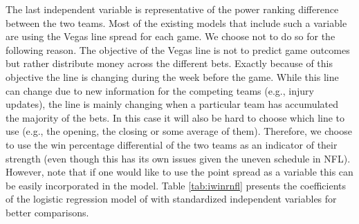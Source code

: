 The last independent variable is representative of the power ranking difference between the two teams. 
Most of the existing models that include such a variable are using the Vegas line spread for each game.  
We choose not to do so for the following reason.  
The objective of the Vegas line is not to predict game outcomes but rather distribute money across the different bets.  
Exactly because of this objective the line is changing during the week before the game.  
While this line can change due to new information for the competing teams (e.g., injury updates), the line is mainly changing when a particular team has accumulated the majority of the bets. 
In this case it will also be hard to choose which line to use (e.g., the opening, the closing or some average of them).  
Therefore, we choose to use the win percentage differential of the two teams as an indicator of their strength (even though this has its own issues given the uneven schedule in NFL).  
However, note that if one would like to use the point spread as a variable this can be easily incorporated in the model. 
Table \ref{tab:iwinrnfl} presents the coefficients of the logistic regression model of {\method} with standardized independent variables for better comparisons. 


